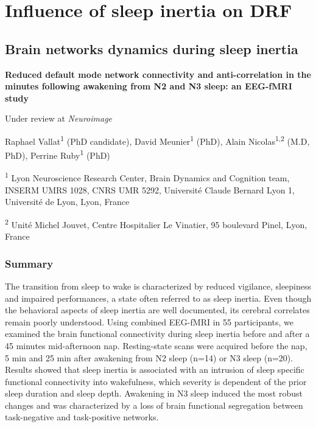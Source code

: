 \cleardoublepage

\chapter{Influence of sleep inertia on DRF}
\label{res:inertia}

% 

\section{Brain networks dynamics during sleep inertia}
\label{res:inertia:inertia}

\bigskip

\textbf{{\large Reduced default mode network connectivity and anti-correlation in the minutes following awakening from N2 and N3 sleep: an EEG-fMRI study}}

\hfill Under review at \emph{Neuroimage}

\bigskip

Raphael Vallat\textsuperscript{1} (PhD candidate), David Meunier\textsuperscript{1} (PhD), Alain Nicolas\textsuperscript{1,2} (M.D, PhD), Perrine Ruby\textsuperscript{1} (PhD)

\textsuperscript{1} Lyon Neuroscience Research Center, Brain Dynamics and Cognition team, INSERM UMRS 1028, CNRS UMR 5292, Université Claude Bernard Lyon 1, Université de Lyon, Lyon, France

\textsuperscript{2} Unité Michel Jouvet, Centre Hospitalier Le Vinatier, 95 boulevard Pinel, Lyon, France

\subsection*{Summary}
\label{res:inertia:inertia:summary}

The transition from sleep to wake is characterized by reduced vigilance, sleepiness and impaired performances, a state often referred to as sleep inertia. Even though the behavioral aspects of sleep inertia are well documented, its cerebral correlates remain poorly understood. Using combined EEG-fMRI in 55 participants, we examined the brain functional connectivity during sleep inertia before and after a 45 minutes mid-afternoon nap. Resting-state scans were acquired before the nap, 5 min and 25 min after awakening from N2 sleep (n=14) or N3 sleep (n=20). Results showed that sleep inertia is associated with an intrusion of sleep specific functional connectivity into wakefulness, which severity is dependent of the prior sleep duration and sleep depth. Awakening in N3 sleep induced the most robust changes and was characterized by a loss of brain functional segregation between task-negative and task-positive networks.

